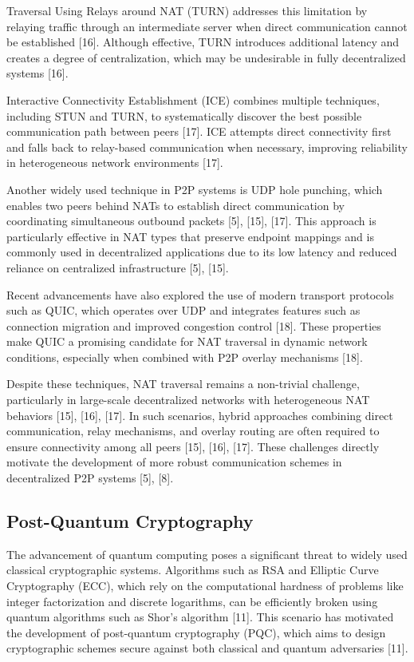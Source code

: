 \documentclass[12pt]{article}
\begin{document}
Traversal Using Relays around NAT (TURN) addresses this limitation by relaying traffic through an intermediate server when direct communication cannot be established [16]. Although effective, TURN introduces additional latency and creates a degree of centralization, which may be undesirable in fully decentralized systems [16].

Interactive Connectivity Establishment (ICE) combines multiple techniques, including STUN and TURN, to systematically discover the best possible communication path between peers [17]. ICE attempts direct connectivity first and falls back to relay-based communication when necessary, improving reliability in heterogeneous network environments [17].

Another widely used technique in P2P systems is UDP hole punching, which enables two peers behind NATs to establish direct communication by coordinating simultaneous outbound packets [5], [15], [17]. This approach is particularly effective in NAT types that preserve endpoint mappings and is commonly used in decentralized applications due to its low latency and reduced reliance on centralized infrastructure [5], [15].

Recent advancements have also explored the use of modern transport protocols such as QUIC, which operates over UDP and integrates features such as connection migration and improved congestion control [18]. These properties make QUIC a promising candidate for NAT traversal in dynamic network conditions, especially when combined with P2P overlay mechanisms [18].

Despite these techniques, NAT traversal remains a non-trivial challenge, particularly in large-scale decentralized networks with heterogeneous NAT behaviors [15], [16], [17]. In such scenarios, hybrid approaches combining direct communication, relay mechanisms, and overlay routing are often required to ensure connectivity among all peers [15], [16], [17]. These challenges directly motivate the development of more robust communication schemes in decentralized P2P systems [5], [8].

\subsection{Post-Quantum Cryptography}

The advancement of quantum computing poses a significant threat to widely used classical cryptographic systems. Algorithms such as RSA and Elliptic Curve Cryptography (ECC), which rely on the computational hardness of problems like integer factorization and discrete logarithms, can be efficiently broken using quantum algorithms such as Shor's algorithm [11]. This scenario has motivated the development of post-quantum cryptography (PQC), which aims to design cryptographic schemes secure against both classical and quantum adversaries [11].
\end{document}
